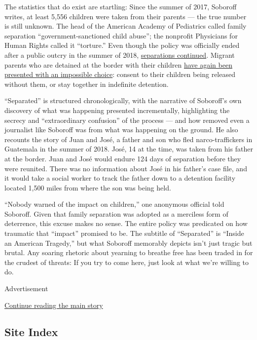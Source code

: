 The statistics that do exist are startling: Since the summer of 2017,
Soboroff writes, at least 5,556 children were taken from their parents
--- the true number is still unknown. The head of the American Academy
of Pediatrics called family separation ``government-sanctioned child
abuse''; the nonprofit Physicians for Human Rights called it
``torture.'' Even though the policy was officially ended after a public
outcry in the summer of 2018,
\href{https://www.nytimes.com/2019/07/30/us/migrant-family-separations.html}{separations
continued}. Migrant parents who are detained at the border with their
children
\href{https://www.nbcnews.com/politics/immigration/despite-judge-s-order-migrant-children-remain-detained-amid-covid-n1234705}{have
again been presented with an impossible choice}: consent to their
children being released without them, or stay together in indefinite
detention.

``Separated'' is structured chronologically, with the narrative of
Soboroff's own discovery of what was happening presented incrementally,
highlighting the secrecy and ``extraordinary confusion'' of the process
--- and how removed even a journalist like Soboroff was from what was
happening on the ground. He also recounts the story of Juan and José, a
father and son who fled narco-traffickers in Guatemala in the summer of
2018. José, 14 at the time, was taken from his father at the border.
Juan and José would endure 124 days of separation before they were
reunited. There was no information about José in his father's case file,
and it would take a social worker to track the father down to a
detention facility located 1,500 miles from where the son was being
held.

``Nobody warned of the impact on children,'' one anonymous official told
Soboroff. Given that family separation was adopted as a merciless form
of deterrence, this excuse makes no sense. The entire policy was
predicated on how traumatic that ``impact'' promised to be. The subtitle
of ``Separated'' is ``Inside an American Tragedy,'' but what Soboroff
memorably depicts isn't just tragic but brutal. Any soaring rhetoric
about yearning to breathe free has been traded in for the crudest of
threats: If you try to come here, just look at what we're willing to do.

Advertisement

\protect\hyperlink{after-bottom}{Continue reading the main story}

\hypertarget{site-index}{%
\subsection{Site Index}\label{site-index}}

